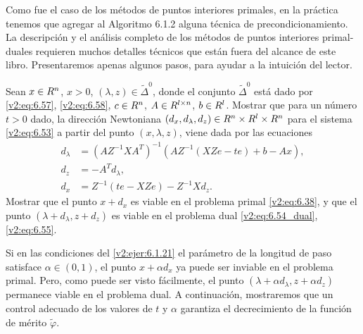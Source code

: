 Como fue el caso de los métodos de puntos interiores primales, en la práctica tenemos que agregar al Algoritmo 6.1.2 alguna técnica de precondicionamiento. La descripción y el análisis completo de los métodos de puntos interiores primal-duales requieren muchos detalles técnicos que están fuera del alcance de este libro. Presentaremos apenas algunos pasos, para ayudar a la intuición del lector.

\begin{exercise}\label{v2:ejer:6.1.21}
    Sean $x \in R^n$, $x > 0$, $(\lambda, z) \in \tilde{\Delta}^0$, donde el conjunto $\tilde{\Delta}^0$ está dado por \eqref{v2:eq:6.57}, \eqref{v2:eq:6.58}, $c \in R^n$, $A \in R^{l \times n}$, $b \in R^l$.
    Mostrar que para un número $t > 0$ dado, la dirección Newtoniana $(d_x, d_\lambda, d_z) \in R^n \times R^l \times R^n$ para el sistema \eqref{v2:eq:6.53} a partir del punto $(x, \lambda, z)$, viene dada por las ecuaciones
    \begin{align}
        d_\lambda &= (A Z^{-1} X A^T)^{-1} (A Z^{-1} (XZ e - te) + b - Ax), \nonumber \\
        d_z &= -A^T d_\lambda, \label{v2:eq:6.61} \\
        d_x &= Z^{-1} (te - XZ e) - Z^{-1} X d_z. \nonumber
    \end{align}
    Mostrar que el punto $x + d_x$ es viable en el problema primal \eqref{v2:eq:6.38}, y que el punto $(\lambda + d_\lambda, z + d_z)$ es viable en el problema dual \eqref{v2:eq:6.54_dual}, \eqref{v2:eq:6.55}.
\end{exercise}

Si en las condiciones del \cref{v2:ejer:6.1.21} el parámetro de la longitud de paso satisface $\alpha \in (0, 1)$, el punto $x + \alpha d_x$ ya puede ser inviable en el problema primal. Pero, como puede ser visto fácilmente, el punto $(\lambda + \alpha d_\lambda, z + \alpha d_z)$ permanece viable en el problema dual. A continuación, mostraremos que un control adecuado de los valores de $t$ y $\alpha$ garantiza el decrecimiento de la función de mérito $\tilde{\varphi}$.

